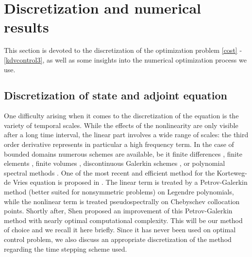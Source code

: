 \section{Discretization and numerical results}
\label{secnum}
This section is devoted to the discretization of the optimization problem \eqref{cost} - \eqref{kdvcontrol3}, as well as some insights into the numerical optimization process we use.
\subsection{Discretization of state and adjoint equation}
One difficulty arising when it comes to the discretization of the \KdVB equation is the variety of temporal scales. While the effects of the nonlinearity are only visible after a long time interval, the linear part involves a wide range of scales: the third order derivative represents in particular a high frequency term. In the case of bounded domains numerous schemes are available, be it finite differences \cite{djidjeli1995numerical,zabusky1965interaction}, finite elements \cite{winther1980conservative,arnold1982superconvergent}, finite volumes \cite{dutykh2013finite}, discontinuous Galerkin schemes \cite{Bona1986859,yan2002local}, or polynomial spectral methods \cite{ma2000legendre,ma2001optimal,shen2003new}. One of the most recent and efficient method for the Korteweg-de Vries equation is proposed in \cite{ma2000legendre}. The linear term is treated by a Petrov-Galerkin method (better suited for nonsymmetric problems) on Legendre polynomials, while the nonlinear term is treated pseudospectrally on Chebyschev collocation points. Shortly after, Shen \cite{shen2003new} proposed an improvement of this Petrov-Galerkin method with nearly optimal computational complexity. This will be our method of choice and we recall it here briefly. Since it has never been used on optimal control problem, we also discuss an appropriate discretization of the method regarding the time stepping scheme used.




